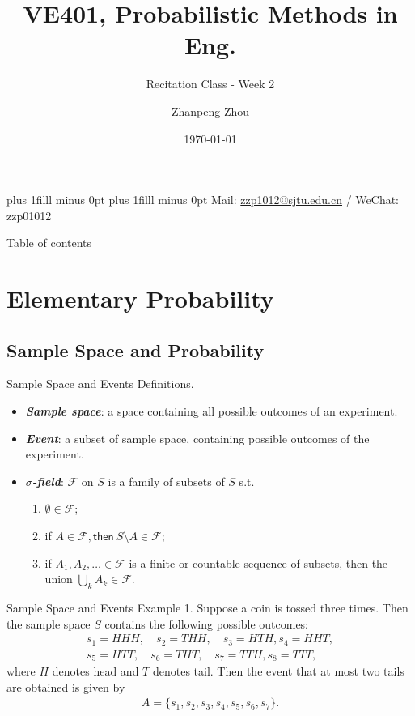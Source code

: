 \documentclass[hyperref={pdfpagelabels=false}]{beamer}
\title{VE401, Probabilistic Methods in Eng.}
\subtitle{Recitation Class - Week 2}
\author[Z Zhou]{Zhanpeng Zhou}
\institute[UMJI-SJTU]{UMJI-SJTU Joint Institute}
\date{\today}
\newcommand{\highlightg}[1]{\textcolor[rgb]{0.1,0.5,0.3}{\emph{\textbf{#1}}}}
\newcommand{\structb}[1]{\textcolor[rgb]{0.2,0.2,0.7}{#1}}
\def\vfilll{\vskip 0pt plus 1filll minus 0pt }
\begin{document}
%
\begin{frame}
    \vfilll
    \titlepage
    \vfilll
     Mail: \href{mailto:zzp1012@sjtu.edu.cn}{zzp1012@sjtu.edu.cn} / WeChat: zzp01012
\end{frame}
%
\begin{frame}{Table of contents}
    \tableofcontents[hideothersubsections]
\end{frame}
%
\section{Elementary Probability}
%
\subsection{Sample Space and Probability}
%
\begin{frame}{Sample Space and Events}
    \structb{Definitions.}
    \begin{itemize}
    	\justifying
    	\item \highlightg{Sample space}: a space containing all possible outcomes of an experiment.
    	\item \highlightg{Event}: a subset of sample space, containing possible outcomes of the experiment.
    	\item \highlightg{$\sigma$-field}: $\mathcal{F}$ on $S$ is a family of subsets of $S$ s.t.
    	\begin{enumerate}
    		\justifying
    		\item $\emptyset\in \mathcal{F}$;
    		\item if $A\in \mathcal{F}, \mathsf{then\ } S\setminus A \in \mathcal{F}$;
    		\item if $A_1, A_2, \ldots \in \mathcal{F}$ is a finite or countable sequence of subsets, then the union $\bigcup_k A_k\in \mathcal{F}$.
    	\end{enumerate}
    \end{itemize}
\end{frame}
%
\begin{frame}{Sample Space and Events}
    \structb{Example 1.} Suppose a coin is tossed three times. Then the sample space $S$ contains the following possible outcomes:
    \begin{align*}
        s_1 = HHH, \quad s_2 = THH, \quad s_3 = HTH, s_4 = HHT, \\
        s_5 = HTT, \quad s_6 = THT, \quad s_7 = TTH, s_8 = TTT,
    \end{align*}
    where $H$ denotes head and $T$ denotes tail. Then the event that at most two tails are obtained is given by
    \pause
    \begin{align*}
        A = \{s_1, s_2, s_3, s_4, s_5, s_6, s_7\}.
    \end{align*}
\end{frame}
\end{document}
